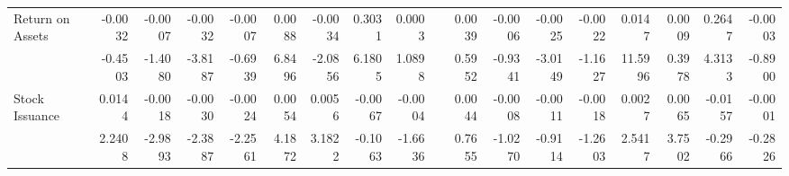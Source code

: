 \begin{table}[htbp]
{\begin{tabular}{lrrrrrrrrrrrrrrrrr}
      Return on Assets & -0.0032 & -0.0007 & -0.0032 & -0.0007 & 0.0088 & -0.0034 & 0.3031 & 0.0003 &       & 0.0039 & -0.0006 & -0.0025 & -0.0022 & 0.0147 & 0.0009 & 0.2647 & -0.0003 \\
            & -0.4503 & -1.4080 & -3.8187 & -0.6939 & 6.8496 & -2.0856 & 6.1805 & 1.0898 &       & 0.5952 & -0.9341 & -3.0149 & -1.1627 & 11.5996 & 0.3978 & 4.3133 & -0.8900 \\
      Stock Issuance & 0.0144 & -0.0018 & -0.0030 & -0.0024 & 0.0054 & 0.0056 & -0.0067 & -0.0004 &       & 0.0044 & -0.0008 & -0.0011 & -0.0018 & 0.0027 & 0.0065 & -0.0157 & -0.0001 \\
            & 2.2408 & -2.9893 & -2.3887 & -2.2561 & 4.1872 & 3.1822 & -0.1063 & -1.6636 &       & 0.7655 & -1.0270 & -0.9114 & -1.2603 & 2.5417 & 3.7502 & -0.2966 & -0.2826 \\
      \bottomrule
      \end{tabular}%
    }
    \label{tab:epu-ff6v}%
  \end{table}%
  